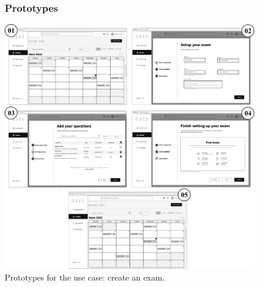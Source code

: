 \documentclass[]{uc2pfecaneva}
\begin{document}
    \begin{figure}
        \subsubsection{Prototypes}
        \includegraphics[width=\textwidth]{images/prototypes_create_exam}

        \caption{Prototypes for the use case: create an exam.}
    \end{figure}
    \clearpage
\end{document}
